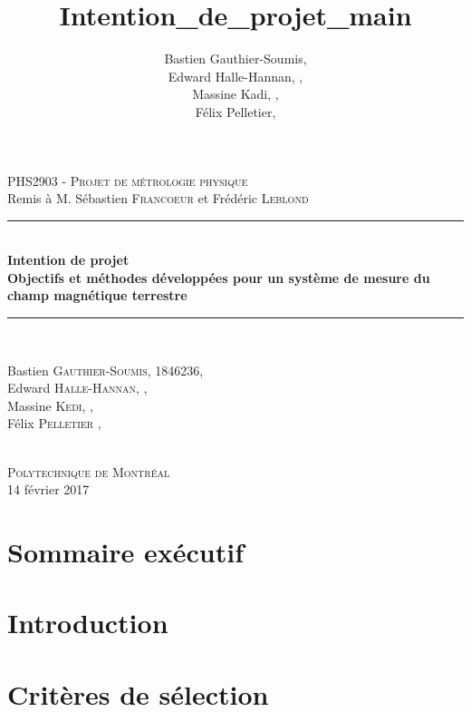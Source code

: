 \documentclass[12pt,a4paper]{article}
\author{Bastien Gauthier-Soumis,\\
 Edward Halle-Hannan, ,\\
Massine Kadi, ,\\
Félix Pelletier, }
\title{Intention_de_projet_main}
\begin{document}
\begin{titlepage}
	\begin{flushright}
\def\logoscale{0.5}


\end{flushright}
\begin{center}
	\textsc{\Large{PHS2903 - Projet de métrologie physique}}\\
    \large{Remis à M. Sébastien \textsc{Francoeur} et Frédéric \textsc{Leblond}  }\\
    [1.5cm]
	\rule{\linewidth}{0.5mm} \\ %
	[0.4cm]
    \Large{\bfseries Intention de projet} \\
	\huge{\bfseries Objectifs et méthodes développées pour un système de mesure du champ magnétique terrestre} \\
	[0.4cm]
   
	\rule{\linewidth}{0.5mm} \\ %
	[1.5cm]
	\begin{minipage}{10cm}
		\begin{center}
		\large{Bastien \textsc{Gauthier-Soumis}, 1846236,\\
		 Edward \textsc{Halle-Hannan}, ,\\
		Massine \textsc{Kedi}, ,\\
		Félix \textsc{Pelletier} ,\\}
		
      
		\end{center}
	\end{minipage}
	~\\
	[1.5cm]
	\vfill
	\textsc{\Large{Polytechnique de Montréal}}\\ 
	\Large{14 février 2017}\\%
\end{center}
\end{titlepage}


\section{Sommaire exécutif}

\section{Introduction}



\section{Critères de sélection}

\end{document}
